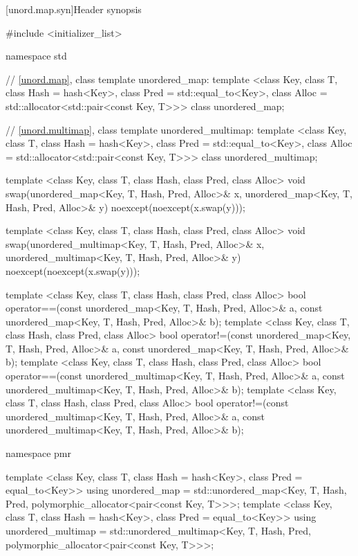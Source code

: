 [unord.map.syn]{Header  synopsis}%
%
%
%
\begin{codeblock}
#include <initializer_list>

namespace std {
  // \ref{unord.map}, class template unordered_map:
  template <class Key,
            class T,
            class Hash = hash<Key>,
            class Pred = std::equal_to<Key>,
            class Alloc = std::allocator<std::pair<const Key, T>>>
    class unordered_map;

  // \ref{unord.multimap}, class template unordered_multimap:
  template <class Key,
            class T,
            class Hash = hash<Key>,
            class Pred = std::equal_to<Key>,
            class Alloc = std::allocator<std::pair<const Key, T>>>
    class unordered_multimap;

  template <class Key, class T, class Hash, class Pred, class Alloc>
    void swap(unordered_map<Key, T, Hash, Pred, Alloc>& x,
              unordered_map<Key, T, Hash, Pred, Alloc>& y)
      noexcept(noexcept(x.swap(y)));

  template <class Key, class T, class Hash, class Pred, class Alloc>
    void swap(unordered_multimap<Key, T, Hash, Pred, Alloc>& x,
              unordered_multimap<Key, T, Hash, Pred, Alloc>& y)
      noexcept(noexcept(x.swap(y)));

  template <class Key, class T, class Hash, class Pred, class Alloc>
    bool operator==(const unordered_map<Key, T, Hash, Pred, Alloc>& a,
                    const unordered_map<Key, T, Hash, Pred, Alloc>& b);
  template <class Key, class T, class Hash, class Pred, class Alloc>
    bool operator!=(const unordered_map<Key, T, Hash, Pred, Alloc>& a,
                    const unordered_map<Key, T, Hash, Pred, Alloc>& b);
  template <class Key, class T, class Hash, class Pred, class Alloc>
    bool operator==(const unordered_multimap<Key, T, Hash, Pred, Alloc>& a,
                    const unordered_multimap<Key, T, Hash, Pred, Alloc>& b);
  template <class Key, class T, class Hash, class Pred, class Alloc>
    bool operator!=(const unordered_multimap<Key, T, Hash, Pred, Alloc>& a,
                    const unordered_multimap<Key, T, Hash, Pred, Alloc>& b);

  namespace pmr {
    template <class Key,
              class T,
              class Hash = hash<Key>,
              class Pred = equal_to<Key>>
      using unordered_map =
        std::unordered_map<Key, T, Hash, Pred,
                           polymorphic_allocator<pair<const Key, T>>>;
    template <class Key,
              class T,
              class Hash = hash<Key>,
              class Pred = equal_to<Key>>
      using unordered_multimap =
        std::unordered_multimap<Key, T, Hash, Pred,
                                polymorphic_allocator<pair<const Key, T>>>;

  }
}
\end{codeblock}

